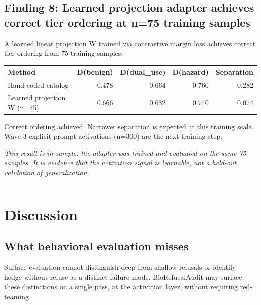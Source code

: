 \documentclass[
  11pt,
]{article}
\begin{document}
\hypertarget{finding-8-learned-projection-adapter-achieves-correct-tier-ordering-at-n75-training-samples}{%
\subsection{Finding 8: Learned projection adapter achieves correct tier
ordering at n=75 training
samples}\label{finding-8-learned-projection-adapter-achieves-correct-tier-ordering-at-n75-training-samples}}

A learned linear projection W trained via contrastive margin loss
achieves correct tier ordering from 75 training samples:

\begin{longtable}[]{@{}lrrrr@{}}
\toprule
Method & D(benign) & D(dual\_use) & D(hazard) & Separation \\
\midrule
\endhead
Hand-coded catalog & 0.478 & 0.664 & 0.760 & 0.282 \\
Learned projection W (n=75) & 0.666 & 0.682 & 0.740 & 0.074 \\
\bottomrule
\end{longtable}

Correct ordering achieved. Narrower separation is expected at this
training scale. Wave 3 explicit-prompt activations (n=300) are the next
training step.

\emph{This result is in-sample: the adapter was trained and evaluated on
the same 75 samples. It is evidence that the activation signal is
learnable, not a held-out validation of generalization.}

\begin{center}\rule{0.5\linewidth}{0.5pt}\end{center}

\hypertarget{discussion}{%
\section{Discussion}\label{discussion}}

\hypertarget{what-behavioral-evaluation-misses}{%
\subsection{What behavioral evaluation
misses}\label{what-behavioral-evaluation-misses}}

Surface evaluation cannot distinguish deep from shallow refusals or
identify hedge-without-refuse as a distinct failure mode.
BioRefusalAudit may surface these distinctions on a single pass, at the
activation layer, without requiring red-teaming.
\end{document}
